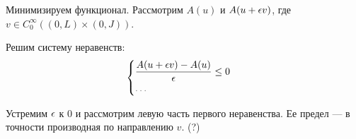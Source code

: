 {\color{gray}

Минимизируем функционал. Рассмотрим $A(u)$ и $A(u + \epsilon v)$, где $v \in C_0^\infty \left((0, L) \times (0, J) \right)$.

Решим систему неравенств:
%
\begin{equation}
  \begin{cases}
    \displaystyle
    \frac{A(u + \eps v) - A(u)}{\eps} \le 0 \\
    {\color{gray} \ldots}
  \end{cases}
\end{equation}

Устремим $\epsilon$ к $0$ и рассмотрим левую часть первого неравенства. Ее предел --- в точности производная по направлению $v$. (?)}